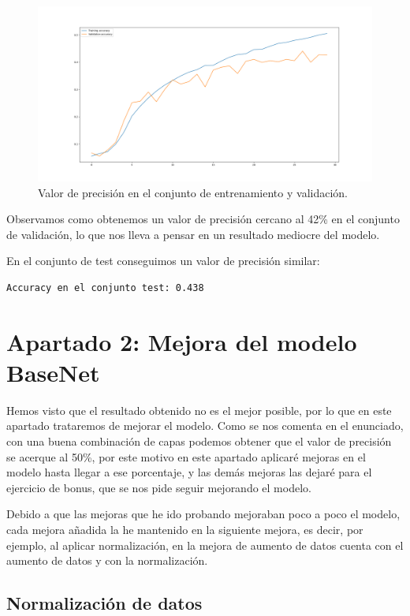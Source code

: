 \documentclass[12pt, spanish]{article}
\begin{document}
\begin{figure}[H]
  \centering
      \includegraphics[width=\textwidth]{1-1-2.png}
 		\caption{Valor de precisión en el conjunto de entrenamiento y validación.}
\end{figure}

Observamos como obtenemos un valor de precisión cercano al 42\% en el conjunto de validación, lo que nos lleva a pensar en un resultado mediocre del modelo.

En el conjunto de test conseguimos un valor de precisión similar:

\begin{lstlisting}
Accuracy en el conjunto test: 0.438
\end{lstlisting}

\section{Apartado 2: Mejora del modelo BaseNet}

Hemos visto que el resultado obtenido no es el mejor posible, por lo que en este apartado trataremos de mejorar el modelo. Como se nos comenta en el enunciado, con una buena combinación de capas podemos obtener que el valor de precisión se acerque al 50\%, por este motivo en este apartado aplicaré mejoras en el modelo hasta llegar a ese porcentaje, y las demás mejoras las dejaré para el ejercicio de bonus, que se nos pide seguir mejorando el modelo.


Debido a que las mejoras que he ido probando mejoraban poco a poco el modelo, cada mejora añadida la he mantenido en la siguiente mejora, es decir, por ejemplo, al aplicar normalización, en la mejora de aumento de datos cuenta con el aumento de datos y con la normalización.

\subsection{Normalización de datos}
\end{document}
